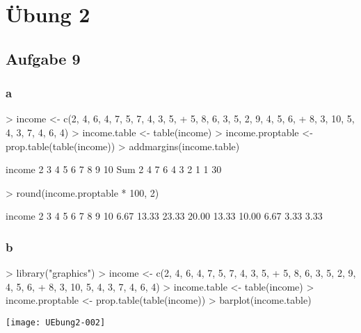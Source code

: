 \documentclass{article}
\begin{document}




\section{Übung 2}
\subsection{Aufgabe 9}
\subsubsection{a}

\begin{Schunk}
\begin{Sinput}
> income <- c(2, 4, 6, 4, 7, 5, 7, 4, 3, 5,
+             5, 8, 6, 3, 5, 2, 9, 4, 5, 6, 
+             8, 3, 10, 5, 4, 3, 7, 4, 6, 4)
> income.table <- table(income)
> income.proptable <- prop.table(table(income))
> addmargins(income.table)
\end{Sinput}
\begin{Soutput}
income
  2   3   4   5   6   7   8   9  10 Sum 
  2   4   7   6   4   3   2   1   1  30 
\end{Soutput}
\begin{Sinput}
> round(income.proptable * 100, 2)
\end{Sinput}
\begin{Soutput}
income
    2     3     4     5     6     7     8     9    10 
 6.67 13.33 23.33 20.00 13.33 10.00  6.67  3.33  3.33 
\end{Soutput}
\end{Schunk}

\subsubsection{b}

\begin{Schunk}
\begin{Sinput}
> library("graphics")
> income <- c(2, 4, 6, 4, 7, 5, 7, 4, 3, 5,
+             5, 8, 6, 3, 5, 2, 9, 4, 5, 6, 
+             8, 3, 10, 5, 4, 3, 7, 4, 6, 4)
> income.table <- table(income)
> income.proptable <- prop.table(table(income))
> barplot(income.table)
\end{Sinput}
\end{Schunk}
\texttt{[image: UEbung2-002]}
\end{document}
